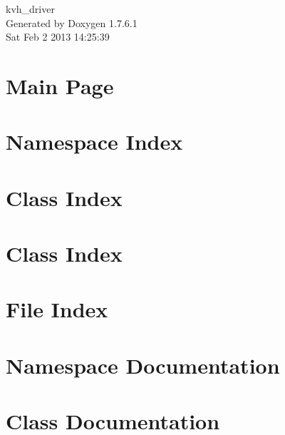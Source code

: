 \documentclass[a4paper]{book}
\begin{document}
\begin{titlepage}
\vspace*{7cm}
\begin{center}
{\Large kvh\-\_\-driver }\\
\vspace*{1cm}
{\large \-Generated by Doxygen 1.7.6.1}\\
\vspace*{0.5cm}
{\small Sat Feb 2 2013 14:25:39}\\
\end{center}
\end{titlepage}
\clearemptydoublepage
{}
\tableofcontents
\clearemptydoublepage
{}
\chapter{\-Main \-Page}
\label{index}
\chapter{\-Namespace \-Index}

\chapter{\-Class \-Index}

\chapter{\-Class \-Index}

\chapter{\-File \-Index}

\chapter{\-Namespace \-Documentation}







\chapter{\-Class \-Documentation}









\end{document}

